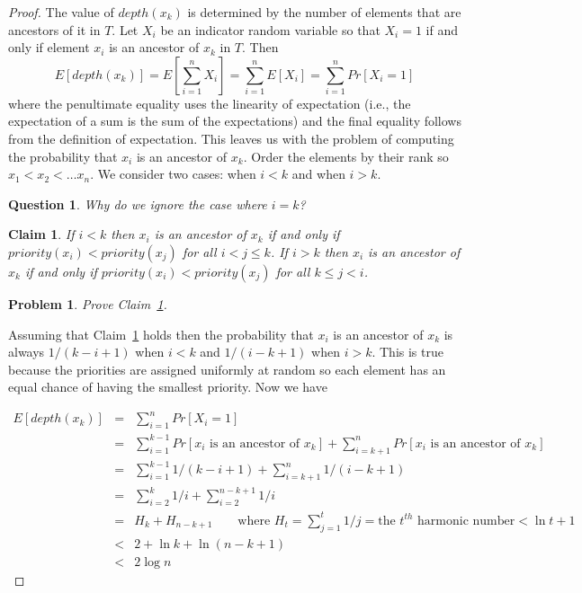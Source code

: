 \documentclass[11pt]{article}
\newtheorem{claim}{Claim}
\newtheorem{question}{Question}
\newtheorem{problem}{Problem}
\begin{document}
\begin{proof}
The value of $depth(x_{k})$ is determined by the number of elements that are ancestors of it in $T$.  Let $X_{i}$ be an indicator random variable so that $X_{i}=1$ if and only if element $x_{i}$ is an ancestor of $x_{k}$ in $T$.  Then
\[
E[depth(x_{k})] = E[\sum_{i=1}^{n} X_{i}] = \sum_{i=1}^{n}E[X_{i}] =  \sum_{i=1}^{n} Pr[X_{i} = 1]
\]
where the penultimate equality uses the linearity of expectation (i.e., the expectation of a sum is the sum of the expectations) and the final equality follows from the definition of expectation.  This leaves us with the problem of computing the probability that $x_{i}$ is an ancestor of $x_{k}$.  Order the elements by their rank so $x_{1} < x_{2} < \ldots x_{n}$.  We consider two cases:  when $i < k$ and when $i > k$.

\begin{question}
Why do we ignore the case where $i=k$?
\end{question}

\begin{claim} \label{claim:ancestor}
If $i < k$ then $x_{i}$ is an ancestor of $x_{k}$ if and only if $priority(x_{i}) < priority(x_{j})$ for all $i < j \leq k$.  If $i > k$ then $x_{i}$ is an ancestor of $x_{k}$ if and only if $priority(x_{i}) < priority(x_{j})$ for all $k \leq j < i$. 
\end{claim}
 
\begin{problem}
Prove Claim~\ref{claim:ancestor}.
\end{problem}

Assuming that Claim~\ref{claim:ancestor} holds then the probability that $x_i$ is an ancestor of $x_k$ is always $1/(k-i+1)$ when $i<k$ and $1/(i-k+1)$ when $i>k$.  This is true because the priorities are assigned uniformly at random so each element has an equal chance of having the smallest priority.  Now we have
 
 \begin{eqnarray*}
 E[depth(x_{k})] & = &  \sum_{i=1}^{n} Pr[X_{i} = 1] \\
 & = & \sum_{i=1}^{k-1} Pr[\mbox{$x_{i}$ is an ancestor of $x_{k}$}] + \sum_{i=k+1}^{n} Pr[\mbox{$x_{i}$ is an ancestor of $x_{k}$}] \\
 & = & \sum_{i=1}^{k-1} 1/(k-i+1) + \sum_{i=k+1}^{n} 1/(i-k+1) \\
 & = & \sum_{i=2}^{k} 1/i + \sum_{i=2}^{n-k+1} 1/i \\
 & = & H_{k} + H_{n-k+1} \qquad\mbox{where $H_{t} = \sum_{j=1}^{t} 1/j = \mbox{the $t^{th}$ harmonic number} < \ln t + 1$} \\
 & < & 2+ \ln k + \ln (n-k+1) \\
 & < & 2\log n
 \end{eqnarray*}
 \end{proof}
\end{document}

